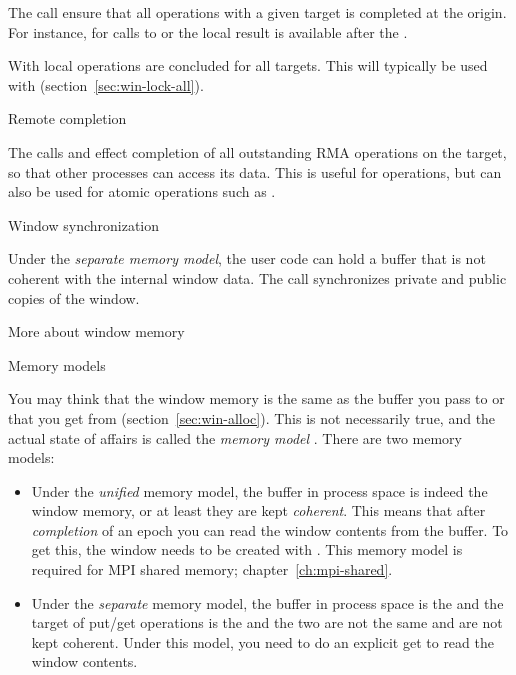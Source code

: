 The call  
ensure that all operations with a given target is completed at the origin.
For instance, for calls to  or
 the local result is available after
the .

With  local operations are
concluded for all targets. This will typically be used
with  (section~\ref{sec:win-lock-all}).

 {Remote completion}

The calls
 and
effect completion of all outstanding \ac{RMA} operations
on the target, so that
other processes can access its data.
This is useful for  operations,
but can also be used for atomic operations
such as .

 {Window synchronization}

Under the
\emph{separate memory model},
the user code can hold a buffer that is not coherent with the internal
window data. The call  synchronizes
private and public copies of the window.

 {More about window memory}

 {Memory models}
\label{sec:win-model}

You may think that the window memory is the same as the buffer you
pass to  or that you get from
 (section~\ref{sec:win-alloc}).
This is not necessarily true, and the
actual state of affairs is called the
\emph{memory model}%
.
There are two memory models:
\begin{itemize}
\item Under the \emph{unified} memory
  model, the buffer in process space is indeed the window memory,
  or at least they are kept \emph{coherent}.
  This
  means that after \emph{completion} of an
  epoch you can read the window contents from the buffer.
  To get this, the window needs to be created with
  .
  This memory model is required for MPI shared memory; chapter~\ref{ch:mpi-shared}.
\item Under the \emph{separate} memory
  model, the buffer in process space is the
   and the target of put/get operations
  is the  and the two are not the same
  and are not kept coherent. Under this model, you need to do an
  explicit get to read the window contents.
\end{itemize}

